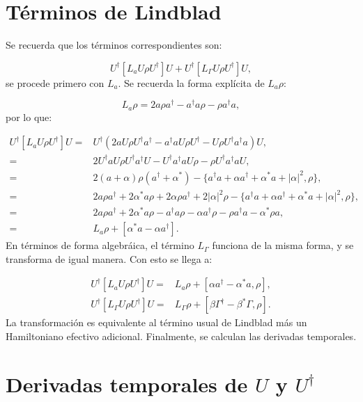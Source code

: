 \documentclass[a4paper,10pt]{report}
\begin{document}
\section{Términos de Lindblad}

Se recuerda que los términos correspondientes son:

\begin{equation}
U^\dagger [L_aU\rho U^\dagger]U + U^\dagger [L_\Gamma U\rho U^\dagger]U,
\end{equation} se procede primero con $L_a$. Se recuerda la forma explícita de $L_a \rho$:

\begin{equation}
L_a\rho = 2a\rho a^\dagger - a^\dagger a \rho - \rho a^\dagger a,
\end{equation} por lo que:

\begin{align*}
U^\dagger [L_aU\rho U^\dagger]U =& U^\dagger(2aU\rho U^\dagger a^\dagger - a^\dagger a U\rho U^\dagger - U\rho U^\dagger a^\dagger a)U,\\
=& 2U^\dagger a U \rho U^\dagger a^\dagger U - U^\dagger a^\dagger a U \rho -\rho U^\dagger a^\dagger a U, \\
=& 2(a+\alpha)\rho(a^\dagger+\alpha^*)-\{a^\dagger a +\alpha a^\dagger + \alpha^* a + |\alpha|^2,\rho \},\\
=& 2a\rho a^\dagger + 2\alpha^* a\rho +2\alpha \rho a^\dagger + 2|\alpha|^2\rho -\{a^\dagger a +\alpha a^\dagger + \alpha^* a + |\alpha|^2,\rho \},\\
=& 2a\rho a^\dagger + 2\alpha^* a\rho - a^\dagger a \rho -\alpha a^\dagger \rho -\rho a^\dagger a -\alpha^* \rho a,\\
=& L_a\rho + [\alpha^* a - \alpha a^\dagger].
\end{align*} En términos de forma algebráica, el término $L_\Gamma$ funciona de la misma forma, y se transforma de igual manera. Con esto se llega a:

\begin{align}
U^\dagger [L_aU\rho U^\dagger]U=& L_a\rho + [\alpha a^\dagger - \alpha^* a,\rho],\\
U^\dagger [L_\Gamma U\rho U^\dagger]U =& L_\Gamma \rho + [ \beta \Gamma^\dagger - \beta^* \Gamma,\rho].
\end{align} La transformación es equivalente al término usual de Lindblad más un Hamiltoniano efectivo adicional. Finalmente, se calculan las derivadas temporales.

\section{Derivadas temporales de $U$ y $U^\dagger$}
\end{document}
